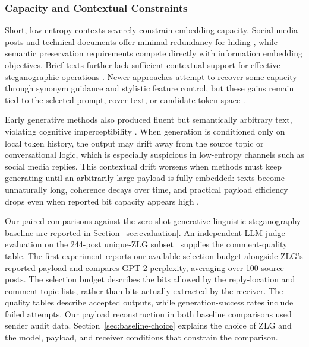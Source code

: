\subsubsection{Capacity and Contextual Constraints}

Short, low-entropy contexts severely constrain embedding capacity. Social media posts and technical documents offer minimal redundancy for hiding \cite{liao2024co}, while semantic preservation requirements compete directly with information embedding objectives. Brief texts further lack sufficient contextual support for effective steganographic operations \cite{ding2023context}. Newer approaches attempt to recover some capacity through synonym guidance and stylistic feature control, but these gains remain tied to the selected prompt, cover text, or candidate-token space \cite{kuznetsov2025deepstego,wozniak2025multicriteria}.

Early generative methods also produced fluent but semantically arbitrary text, violating cognitive imperceptibility \cite{ding2023context}. When generation is conditioned only on local token history, the output may drift away from the source topic or conversational logic, which is especially suspicious in low-entropy channels such as social media replies. This contextual drift worsens when methods must keep generating until an arbitrarily large payload is fully embedded: texts become unnaturally long, coherence decays over time, and practical payload efficiency drops even when reported bit capacity appears high \cite{li2024semantic,xiang2023cpg,steinebach2024natural,xu2024beyond}.

Our paired comparisons against the zero-shot generative linguistic steganography baseline \cite{lin2024zero} are reported in Section~\ref{sec:evaluation}.
An independent LLM-judge evaluation on the 244-post unique-ZLG subset~\cite{lin2024zero} supplies the comment-quality table.
The first experiment reports our available selection budget alongside ZLG's reported payload and compares GPT-2 perplexity, averaging over 100 source posts. The selection budget describes the bits allowed by the reply-location and comment-topic lists, rather than bits actually extracted by the receiver. The quality tables describe accepted outputs, while generation-success rates include failed attempts. Our payload reconstruction in both baseline comparisons used sender audit data. Section~\ref{sec:baseline-choice} explains the choice of ZLG and the model, payload, and receiver conditions that constrain the comparison.

